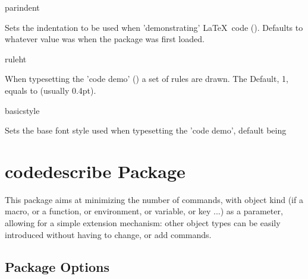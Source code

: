 \documentclass{article}
\begin{document}
\begin{codedescribe}[key]{parindent}
\begin{codesyntax} %
\end{codesyntax}
Sets the indentation to be used when 'demonstrating' \LaTeX\ code (\tsobj[code]{\tsdemo}). Defaults to whatever value \tsobj[code]{\parindent} was when the package was first loaded.
\end{codedescribe}

\begin{codedescribe}[key]{ruleht}%
\begin{codesyntax} %
\end{codesyntax}
When typesetting the 'code demo' (\tsobj{\tsdemo}) a set of rules are drawn. The Default, 1, equals to \tsobj{\arrayrulewidth} (usually 0.4pt).
\end{codedescribe}

\begin{codedescribe}[key,new=2023/11/18]{basicstyle}%
\begin{codesyntax} %
\end{codesyntax}
Sets the base font style used when typesetting the 'code demo', default being \tsobj{\footnotesize} \tsobj{\ttfamily}
\end{codedescribe}


\section{codedescribe Package}

This package aims at minimizing the number of commands, with object kind (if a macro, or a function, or environment, or variable, or key ...) as a parameter, allowing for a simple extension mechanism: other object types can be easily introduced without having to change, or add commands.

\subsection{Package Options}
\end{document}
